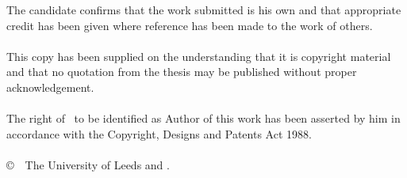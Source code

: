 
\begin{ipstatement} %

The candidate confirms that the work submitted is his own and that
appropriate credit has been given where reference has been made to
the work of others.
\\
\\
This copy has been supplied on the understanding that it is copyright
material and that no quotation from the thesis may be published
without proper acknowledgement.
\\
\\
The right of \theAuthor\ to be identified as Author of this work
has been asserted by him in accordance with the Copyright, Designs
and Patents Act 1988.
\\
\\
\copyright\ \the\year\ The University of Leeds and \theAuthor.

\end{ipstatement}


